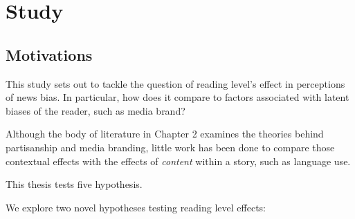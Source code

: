 \chapter{Study}

\section{Motivations}
 
 





 
This study sets out to tackle the question of reading level's effect in perceptions of news bias. In particular, how does it compare to factors associated with latent biases of the reader, such as media brand?

Although the body of literature in Chapter 2 examines the theories behind partisanship and media branding, little work has been done to compare those contextual effects with the effects of \emph{content} within a story, such as language use.

This thesis tests five hypothesis.

We explore two novel hypotheses testing reading level effects:

